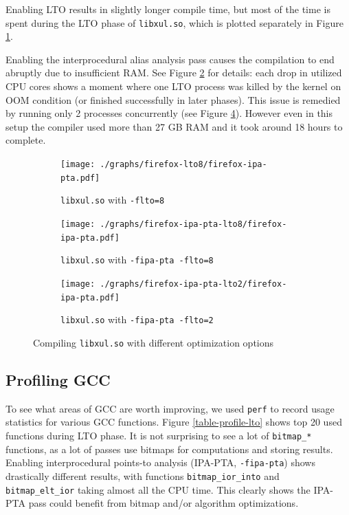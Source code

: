 Enabling LTO results in slightly longer compile time, but most of the time is
spent during the LTO phase of {\tt libxul.so}, which is plotted separately in Figure
\ref{figure-firefox-lto8}.

Enabling the interprocedural alias analysis pass causes the compilation to end
abruptly due to insufficient RAM.  See Figure \ref{figure-firefox-ipa-pta-lto8}
for details: each drop in utilized CPU cores shows a moment where one LTO
process was killed by the kernel on OOM condition (or finished successfully in
later phases). This issue is remedied by running only 2 processes concurrently
(see Figure \ref{figure-firefox-ipa-pta-lto2}).  However even in this setup the
compiler used more than 27 GB RAM and it took around 18 hours to complete.

\begin{figure}
\begin{subfigure}[b]{\textwidth}
	\centering
	\texttt{[image: ./graphs/firefox-lto8/firefox-ipa-pta.pdf]}
	\caption{{\tt libxul.so} with {\tt -flto=8}}
	\label{figure-firefox-lto8}
\end{subfigure}
\begin{subfigure}[b]{\textwidth}
	\centering
	\texttt{[image: ./graphs/firefox-ipa-pta-lto8/firefox-ipa-pta.pdf]}
	\caption{{\tt libxul.so} with {\tt -fipa-pta -flto=8}}
	\label{figure-firefox-ipa-pta-lto8}
\end{subfigure}
\begin{subfigure}[b]{\textwidth}
	\centering
	\texttt{[image: ./graphs/firefox-ipa-pta-lto2/firefox-ipa-pta.pdf]}
	\caption{{\tt libxul.so} with {\tt -fipa-pta -flto=2}}
	\label{figure-firefox-ipa-pta-lto2}
\end{subfigure}
\caption{Compiling {\tt libxul.so} with different optimization options}
\end{figure}

\subsection{Profiling GCC}

To see what areas of GCC are worth improving, we used {\tt perf}  to record usage
statistics for various GCC functions. Figure \ref{table-profile-lto} shows top 20 used
functions during LTO phase. It is not surprising to see a lot of {\tt bitmap\_*}
functions, as a lot of passes use bitmaps for computations and storing results.
Enabling interprocedural points-to analysis (IPA-PTA, {\tt -fipa-pta}) shows drastically
different results, with functions {\tt bitmap\_ior\_into} and {\tt
bitmap\_elt\_ior} taking almost all the CPU time. This clearly shows the IPA-PTA
pass could benefit from bitmap and/or algorithm optimizations.

